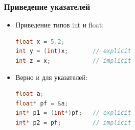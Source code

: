\documentclass[12pt,pdf,hyperref={unicode}]{beamer}
\begin{document}
\begin{frame}[fragile]
\frametitle{Приведение указателей} 
\begin{itemize}
\item Приведение типов int и float: \\
\begin{lstlisting}[language=C++,basicstyle=\ttfamily,keywordstyle=\color{blue}]
float x = 5.2;
int y = (int)x;       // explicit
int z = x;            // implicit
\end{lstlisting}
\item Верно и для указателей: \\
\begin{lstlisting}[language=C++,basicstyle=\ttfamily,keywordstyle=\color{blue}]
float a;
float* pf = &a;
int* p1 = (int*)pf;   // explicit
int* p2 = pf;         // implicit
\end{lstlisting}
\end{itemize}
\end{frame}
\end{document}

